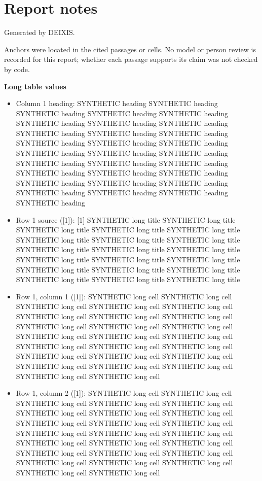 \documentclass[journal]{IEEEtran}
\begin{document}
\section*{Report notes}

Generated by DEIXIS.

Anchors were located in the cited passages or cells. No model or person review is recorded for this report; whether each passage supports its claim was not checked by code.

\noindent\textbf{Long table values}

\begin{itemize}
\item[1.] Column 1 heading: SYNTHETIC heading SYNTHETIC heading SYNTHETIC heading SYNTHETIC heading SYNTHETIC heading SYNTHETIC heading SYNTHETIC heading SYNTHETIC heading SYNTHETIC heading SYNTHETIC heading SYNTHETIC heading SYNTHETIC heading SYNTHETIC heading SYNTHETIC heading SYNTHETIC heading SYNTHETIC heading SYNTHETIC heading SYNTHETIC heading SYNTHETIC heading SYNTHETIC heading SYNTHETIC heading SYNTHETIC heading SYNTHETIC heading SYNTHETIC heading SYNTHETIC heading SYNTHETIC heading SYNTHETIC heading SYNTHETIC heading SYNTHETIC heading SYNTHETIC heading
\item[2.] Row 1 source ([1]): [1] SYNTHETIC long title SYNTHETIC long title SYNTHETIC long title SYNTHETIC long title SYNTHETIC long title SYNTHETIC long title SYNTHETIC long title SYNTHETIC long title SYNTHETIC long title SYNTHETIC long title SYNTHETIC long title SYNTHETIC long title SYNTHETIC long title SYNTHETIC long title SYNTHETIC long title SYNTHETIC long title SYNTHETIC long title SYNTHETIC long title SYNTHETIC long title SYNTHETIC long title
\item[3.] Row 1, column 1 ([1]): SYNTHETIC long cell SYNTHETIC long cell SYNTHETIC long cell SYNTHETIC long cell SYNTHETIC long cell SYNTHETIC long cell SYNTHETIC long cell SYNTHETIC long cell SYNTHETIC long cell SYNTHETIC long cell SYNTHETIC long cell SYNTHETIC long cell SYNTHETIC long cell SYNTHETIC long cell SYNTHETIC long cell SYNTHETIC long cell SYNTHETIC long cell SYNTHETIC long cell SYNTHETIC long cell SYNTHETIC long cell SYNTHETIC long cell SYNTHETIC long cell SYNTHETIC long cell SYNTHETIC long cell SYNTHETIC long cell
\item[4.] Row 1, column 2 ([1]): SYNTHETIC long cell SYNTHETIC long cell SYNTHETIC long cell SYNTHETIC long cell SYNTHETIC long cell SYNTHETIC long cell SYNTHETIC long cell SYNTHETIC long cell SYNTHETIC long cell SYNTHETIC long cell SYNTHETIC long cell SYNTHETIC long cell SYNTHETIC long cell SYNTHETIC long cell SYNTHETIC long cell SYNTHETIC long cell SYNTHETIC long cell SYNTHETIC long cell SYNTHETIC long cell SYNTHETIC long cell SYNTHETIC long cell SYNTHETIC long cell SYNTHETIC long cell SYNTHETIC long cell SYNTHETIC long cell

\end{itemize}
\end{document}
